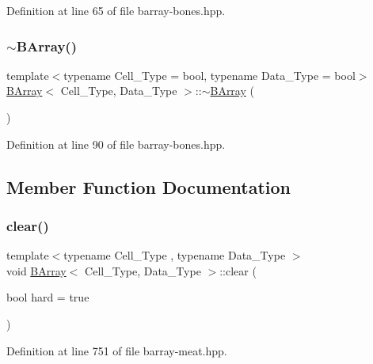 Definition at line 65 of file barray-\/bones.\+hpp.

\mbox{\label{class_b_array_af39acdf29aa5999a7f5fd48141be384e}} 
\subsubsection{\texorpdfstring{$\sim$\+B\+Array()}{~BArray()}}
{\footnotesize\ttfamily template$<$typename Cell\+\_\+\+Type = bool, typename Data\+\_\+\+Type = bool$>$ \\
\hyperlink{class_b_array}{B\+Array}$<$ Cell\+\_\+\+Type, Data\+\_\+\+Type $>$\+::$\sim$\hyperlink{class_b_array}{B\+Array} (\begin{DoxyParamCaption}{ }\end{DoxyParamCaption})\hspace{0.3cm}{\ttfamily [inline]}}



Definition at line 90 of file barray-\/bones.\+hpp.



\subsection{Member Function Documentation}
\mbox{\label{class_b_array_a6dd5ebff333b376c6fb569e48290935f}} 
\subsubsection{\texorpdfstring{clear()}{clear()}}
{\footnotesize\ttfamily template$<$typename Cell\+\_\+\+Type , typename Data\+\_\+\+Type $>$ \\
void \hyperlink{class_b_array}{B\+Array}$<$ Cell\+\_\+\+Type, Data\+\_\+\+Type $>$\+::clear (\begin{DoxyParamCaption}\item[{bool}]{hard = {\ttfamily true} }\end{DoxyParamCaption})\hspace{0.3cm}{\ttfamily [inline]}}



Definition at line 751 of file barray-\/meat.\+hpp.

\mbox{\label{class_b_array_a4096e4447f91ba52766587a08c62f1fa}} 
